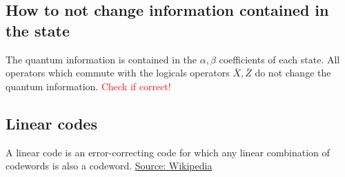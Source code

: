 \subsection{How to not change information contained in the state}
The quantum information is contained in the $\alpha,\beta$ coefficients of each state.
All operators which commute with the logicals operators $\bar{X},\bar{Z}$ do not change the quantum information. \cite{QECmemory}
\textcolor{red}{Check if correct!}


\subsection{Linear codes}\label{sec:basic.math.linear_codes}
A linear code is an error-correcting code for which any linear combination of codewords is also a codeword. \href{https://en.wikipedia.org/wiki/Linear_code}{Source: Wikipedia} 
